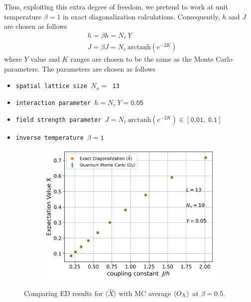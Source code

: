\documentclass[../thesis_main.tex]{subfiles}
\begin{document}
Thus, exploiting this extra degree of freedom, we pretend to work at unit temperature $\beta = 1$ in exact diagonalization calculations. Consequently, $h$ and $J$ are chosen as follows
\begin{subequations}
    \begin{align}
        &h = \beta h = N_\tau \:Y \\
        &J = \beta J = N_\tau \: \text{arctanh}(e^{-2K})
    \end{align}
\end{subequations}
where $Y$ value and $K$ ranges are chosen to be the same as the Monte Carlo parameters. The parameters are chosen as follows
\begin{itemize}[label={}]
    \setlength{\itemsep}{0.1em}
    \item \texttt{spatial lattice size $N_x = $ 13}
    \item \texttt{interaction parameter $h = N_\tau \:Y = \texttt{0.05}$} 
    \item \texttt{field strength parameter $J = N_\tau \: \textrm{arctanh}(e^{-2K}) \in [\texttt{0.01}, \:\texttt{0.1}]$} 
    \item \texttt{inverse temperature $\beta = \texttt{1}$}
\end{itemize}
\begin{figure}[!htb]
    \centering
    \begin{subfigure}[b]{0.55\textwidth}
        \centering
        \includegraphics[width=\textwidth]{images/finite temps L13/X.png}
    \end{subfigure}
    \caption{Comparing ED results for $\langle \hat{X} \rangle$ with MC average $\expval{O_X}$ at $\beta = 0.5$.}
    \label{expvalX_ED_vs_MC_13_FT}
\end{figure}
\vspace*{1em}
\end{document}
